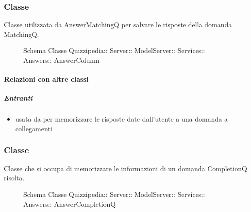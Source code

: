 \subsubsection{Classe }
Classe utilizzata da AnswerMatchingQ per salvare le risposte della domanda MatchingQ.
\begin{figure}[H]
\centering
\noindent{}
\caption[Schema Classe AnswerColumn]{Schema Classe Quizzipedia:: Server:: ModelServer:: Services:: Answers:: AnswerColumn}
\end{figure}
\paragraph{Relazioni con altre classi}
\subparagraph{Entranti}
\begin{itemize}
\item usata da  per memorizzare le risposte date dall'utente a una domanda a collegamenti
\end{itemize}
\subsubsection{Classe }
Classe che si occupa di memorizzare le informazioni di un domanda CompletionQ risolta.
\begin{figure}[H]
\centering
\noindent{}
\caption[Schema Classe AnswerCompletionQ]{Schema Classe Quizzipedia:: Server:: ModelServer:: Services:: Answers:: AnswerCompletionQ}
\end{figure}
